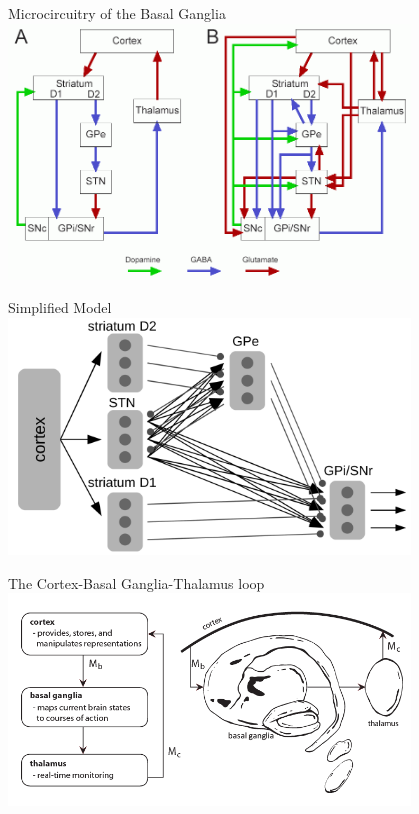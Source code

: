 \documentclass[handout,aspectratio=169]{beamer}
\begin{document}
	\begin{frame}{Microcircuitry of the Basal Ganglia}
		\centering
		\includegraphics[width=0.8\textwidth]{media/basal_ganglia2.png}
	\end{frame}

	\begin{frame}{Simplified Model}
		\centering
		\includegraphics[width=0.8\textwidth]{media/gpr3.png}
	\end{frame}

	\begin{frame}{The Cortex-Basal Ganglia-Thalamus loop}
		\centering
		\includegraphics[width=0.8\textwidth]{media/ctx-bg-thal.png}
	\end{frame}
\end{document}
